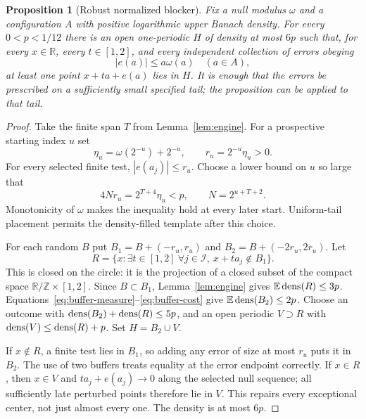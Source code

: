 \documentclass[11pt]{article}
\newtheorem{proposition}[theorem]{Proposition}
\theoremstyle{remark}\newtheorem{remark}[theorem]{Remark}
\newcommand{\R}{\mathbb R}\newcommand{\N}{\mathbb N}\newcommand{\Z}{\mathbb Z}
\newcommand{\T}{\mathbb R/\mathbb Z}\newcommand{\E}{\mathbb E}
\begin{document}
\begin{proposition}[Robust normalized blocker]\label{prop:robust}
Fix a null modulus $\omega$ and a configuration $A$ with positive logarithmic upper Banach density. For every $0<p<1/12$ there is an open one-periodic $H$ of density at most $6p$ such that, for every $x\in\R$, every $t\in[1,2]$, and every independent collection of errors obeying
\[
 |e(a)|\le a\omega(a)\quad(a\in A),
\]
at least one point $x+ta+e(a)$ lies in $H$. It is enough that the errors be prescribed on a sufficiently small specified tail; the proposition can be applied to that tail.
\end{proposition}
\begin{proof}
Take the finite span $T$ from Lemma~\ref{lem:engine}. For a prospective starting index $u$ set
\[
 \eta_u=\omega(2^{-u})+2^{-u},\qquad r_u=2^{-u}\eta_u>0.
\]
For every selected finite test, $|e(a_j)|\le r_u$. Choose a lower bound on $u$ so large that
\begin{equation}\label{eq:buffer-cost}
 4Nr_u=2^{T+4}\eta_u<p,
 \qquad N=2^{u+T+2}.
\end{equation}
Monotonicity of $\omega$ makes the inequality hold at every later start. Uniform-tail placement permits the density-filled template after this choice.

For each random $B$ put $B_1=B+(-r_u,r_u)$ and $B_2=B+(-2r_u,2r_u)$. Let
\[
 R=\{x:\exists t\in[1,2]\ \forall j\in\mathcal I,
                      \ x+ta_j\notin B_1\}.
\]
This is closed on the circle: it is the projection of a closed subset of the compact space $\T\times[1,2]$. Since $B\subset B_1$, Lemma~\ref{lem:engine} gives $\E\dens(R)\le3p$. Equations~\eqref{eq:buffer-measure}--\eqref{eq:buffer-cost} give $\E\dens(B_2)\le2p$. Choose an outcome with $\operatorname{dens}(B_2)+\operatorname{dens}(R)\le5p$, and an open periodic $V\supset R$ with $\operatorname{dens}(V)\le\operatorname{dens}(R)+p$. Set $H=B_2\cup V$.

If $x\notin R$, a finite test lies in $B_1$, so adding any error of size at most $r_u$ puts it in $B_2$. The use of two buffers treats equality at the error endpoint correctly. If $x\in R$, then $x\in V$ and $ta_j+e(a_j)\to0$ along the selected null sequence; all sufficiently late perturbed points therefore lie in $V$. This repairs every exceptional center, not just almost every one. The density is at most $6p$.
\end{proof}
\end{document}
